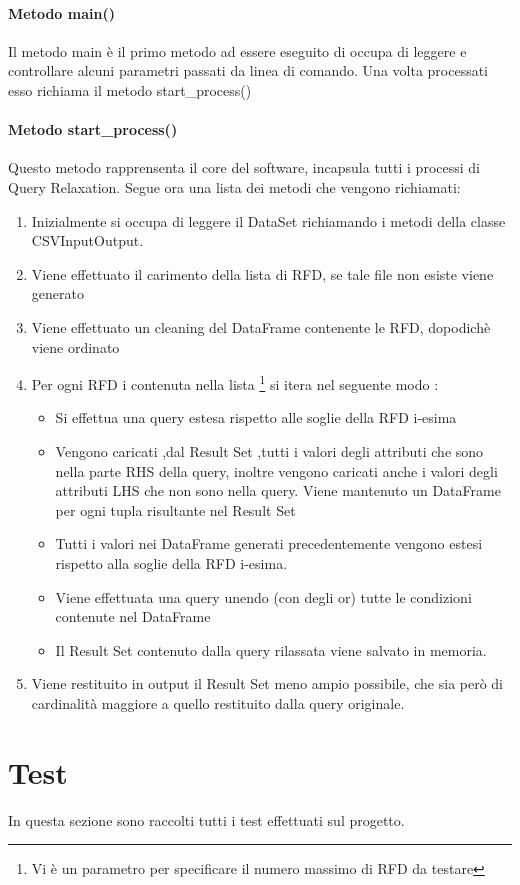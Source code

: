 \paragraph{Metodo main()}
Il metodo main è il primo metodo ad essere eseguito di occupa di leggere e controllare alcuni parametri passati da linea di comando. Una volta processati esso richiama il metodo start{\_}process()

\paragraph{Metodo start{\_}process()}
Questo metodo rapprensenta il core del software, incapsula tutti i processi di Query Relaxation.
Segue ora una lista dei metodi che vengono richiamati:
\begin{enumerate}
    \item Inizialmente si occupa di leggere il DataSet richiamando i metodi della classe CSVInputOutput.
    \item Viene effettuato il carimento della lista di RFD, se tale file non esiste viene generato
    \item Viene effettuato un cleaning del DataFrame contenente le RFD, dopodichè viene ordinato
    \item Per ogni RFD i contenuta nella lista \footnote{Vi è un parametro per specificare il numero massimo di RFD da testare} si itera nel seguente modo :
    \begin{itemize}
        \item Si effettua una query estesa rispetto alle soglie della RFD i-esima
        \item Vengono caricati ,dal Result Set ,tutti i valori degli attributi che sono nella parte RHS della query, inoltre vengono caricati anche i valori degli attributi LHS che non sono nella query. Viene mantenuto un DataFrame per ogni tupla risultante nel Result Set
        \item Tutti i valori nei DataFrame generati precedentemente vengono estesi rispetto alla soglie della RFD i-esima.
        \item Viene effettuata una query unendo (con degli or) tutte le condizioni contenute nel DataFrame
        \item Il Result Set contenuto dalla query rilassata viene salvato in memoria.
    \end{itemize}
    \item Viene restituito in output il Result Set meno ampio possibile, che sia però di cardinalità maggiore a quello restituito dalla query originale.
\end{enumerate}



\section{Test}
In questa sezione sono raccolti tutti i test effettuati sul progetto.

